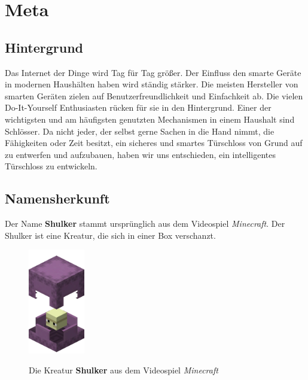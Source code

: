 \chapter{Meta}

\section{Hintergrund}

Das Internet der Dinge wird Tag für Tag größer. Der Einfluss den smarte Geräte in modernen Haushälten haben wird ständig stärker. Die meisten Hersteller von smarten Geräten zielen auf Benutzerfreundlichkeit und Einfachkeit ab. Die vielen Do-It-Yourself Enthusiasten rücken für sie in den Hintergrund. Einer der wichtigsten und am häufigsten genutzten Mechanismen in einem Haushalt sind Schlösser.  Da nicht jeder, der selbst gerne Sachen in die Hand nimmt, die Fähigkeiten oder Zeit besitzt, ein sicheres und smartes Türschloss von Grund auf zu entwerfen und aufzubauen, haben wir uns entschieden, ein intelligentes Türschloss zu entwickeln.

\section{Namensherkunft}

Der Name \textbf{Shulker} stammt ursprünglich aus dem Videospiel \textit{Minecraft}. Der Shulker ist eine Kreatur, die sich in einer Box verschanzt.

\begin{figure}[H]
    \begin{center}
        \includegraphics[width=0.22\textwidth]{images/Intro/Shulker.png}
        \caption{Die Kreatur \textbf{Shulker} aus dem Videospiel \textit{Minecraft}}
        \cite{mcwiki2015}
    \end{center}
\end{figure}

\newpage